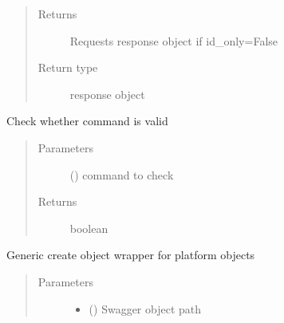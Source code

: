 \documentclass[letterpaper,10pt,english]{sphinxmanual}
\begin{document}
\begin{fulllineitems}
\begin{fulllineitems}
\begin{quote}
\begin{description}
\item[{Returns}] \leavevmode
\sphinxAtStartPar
Requests response object if id\_only=False

\item[{Return type}] \leavevmode
\sphinxAtStartPar
response object

\end{description}\end{quote}

\end{fulllineitems}


\begin{fulllineitems}
\label{\detokenize{b1diagnostics-class:bloxone.b1diagnostics.is_command}}
\sphinxAtStartPar
Check whether command is valid
\begin{quote}\begin{description}
\item[{Parameters}] \leavevmode
\sphinxAtStartPar
{} () \textendash{} command to check

\item[{Returns}] \leavevmode
\sphinxAtStartPar
boolean

\end{description}\end{quote}

\end{fulllineitems}


\begin{fulllineitems}
\label{\detokenize{b1diagnostics-class:bloxone.b1diagnostics.post}}
\sphinxAtStartPar
Generic create object wrapper for platform objects
\begin{quote}\begin{description}
\item[{Parameters}] \leavevmode\begin{itemize}
\item {} 
\sphinxAtStartPar
{} () \textendash{} Swagger object path


\end{itemize}
\end{description}
\end{quote}
\end{fulllineitems}
\end{fulllineitems}
\end{document}
